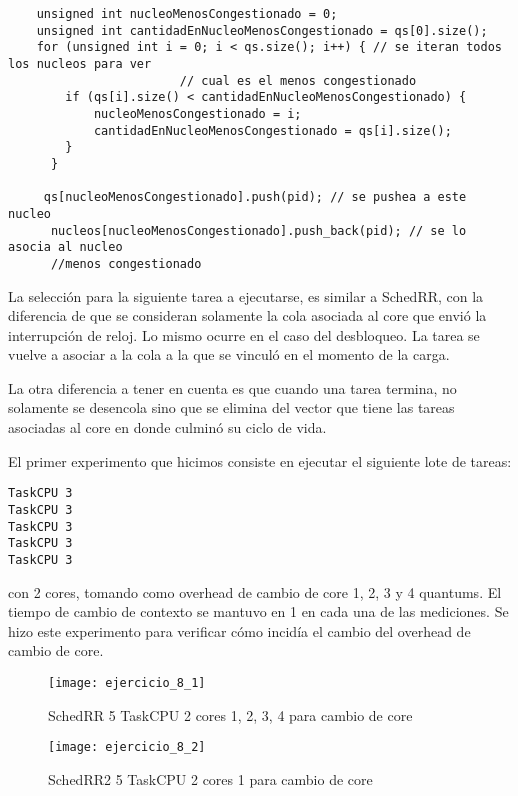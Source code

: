 \begin{verbatim}
    unsigned int nucleoMenosCongestionado = 0;
    unsigned int cantidadEnNucleoMenosCongestionado = qs[0].size();
    for (unsigned int i = 0; i < qs.size(); i++) { // se iteran todos los nucleos para ver
                        // cual es el menos congestionado
        if (qs[i].size() < cantidadEnNucleoMenosCongestionado) {
            nucleoMenosCongestionado = i;
            cantidadEnNucleoMenosCongestionado = qs[i].size();
        }
      }

     qs[nucleoMenosCongestionado].push(pid); // se pushea a este nucleo
      nucleos[nucleoMenosCongestionado].push_back(pid); // se lo asocia al nucleo                         
      //menos congestionado

\end{verbatim}

La selecci\'on para la siguiente tarea a ejecutarse, es similar a SchedRR, con la diferencia de que se consideran solamente la cola asociada al core que envi\'o la interrupci\'on de reloj. Lo mismo ocurre en el caso del desbloqueo. La tarea se vuelve a asociar a la cola a la que se vincul\'o en el momento de la carga.

La otra diferencia a tener en cuenta es que cuando una tarea termina, no solamente se desencola sino que se elimina del vector que tiene las tareas asociadas al core en donde culmin\'o su ciclo de vida.

El primer experimento que hicimos consiste en ejecutar el siguiente lote de tareas:

\begin{verbatim}
TaskCPU 3
TaskCPU 3
TaskCPU 3
TaskCPU 3
TaskCPU 3
\end{verbatim}

con 2 cores, tomando como overhead de cambio de core 1, 2, 3 y 4 quantums. El tiempo de cambio de contexto se mantuvo en 1 en cada una de las mediciones. Se hizo este experimento para verificar c\'omo incid\'ia el cambio del overhead de cambio de core. 


\begin{figure}[H]
\caption{SchedRR 5 TaskCPU 2 cores 1, 2, 3, 4 para cambio de core}
\texttt{[image: ejercicio\_8\_1]}
\end{figure}

\begin{figure}[H]
\caption{SchedRR2 5 TaskCPU 2 cores 1 para cambio de core}
\texttt{[image: ejercicio\_8\_2]}
\end{figure}


